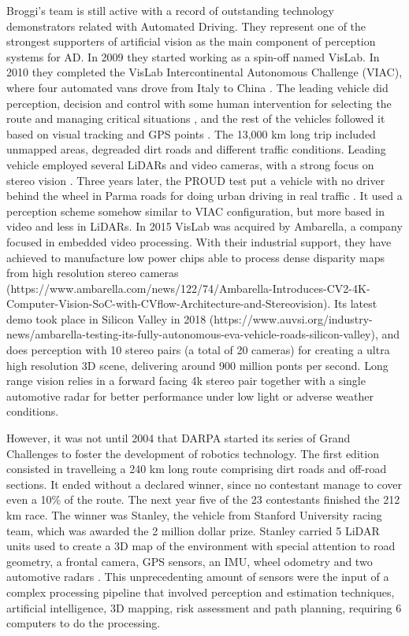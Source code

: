 Broggi's team is still active with a record of outstanding technology 
demonstrators related with Automated Driving. They represent one of the
strongest supporters of artificial vision as the main component of perception
systems for AD. 
In 2009 they started working as a spin-off named VisLab. In 2010 they 
completed the VisLab Intercontinental Autonomous Challenge (VIAC), where
four automated vans drove from Italy to China \cite{Bertozzi2011}.
The leading vehicle did perception, decision and control with some human 
intervention for selecting the route and managing critical situations
\cite{Broggi2012a}, and the rest of the vehicles followed it based on visual
tracking and GPS points \cite{Broggi2012a}. 
The 13,000 km long trip included unmapped areas, degreaded dirt roads and
different traffic conditions. Leading vehicle employed several LiDARs and
video cameras, with a strong focus on stereo vision \cite{Broggi2011}.
Three years later, the PROUD test put a vehicle with no driver behind the
wheel in Parma roads for doing urban driving in real traffic \cite{Broggi2013}. 
It used a perception scheme somehow similar to VIAC configuration, but more 
based in video and less in LiDARs.
In 2015 VisLab was acquired by Ambarella, a company focused in embedded video
processing. With their industrial support, they have achieved to manufacture
low power chips able to process dense disparity maps from high resolution 
stereo cameras 
(https://www.ambarella.com/news/122/74/Ambarella-Introduces-CV2-4K-Computer-Vision-SoC-with-CVflow-Architecture-and-Stereovision).
Its latest demo took place in Silicon Valley in 2018 
(https://www.auvsi.org/industry-news/ambarella-testing-its-fully-autonomous-eva-vehicle-roads-silicon-valley),
and does perception with 10 stereo pairs (a total of 20 cameras) for creating a
ultra high resolution 3D scene, delivering around 900 million ponts per second.
Long range vision relies in a forward facing 4k stereo pair together with a 
single automotive radar for better performance under low light or adverse
weather conditions.

However, it was not until 2004 that DARPA started its series of Grand Challenges
to foster the development of robotics technology. 
The first edition consisted in travelleing a 240 km long route comprising dirt 
roads and off-road sections. It ended without a declared winner, since no 
contestant manage to cover even a 10\% of the route.
The next year five of the 23 contestants finished the 212 km race. 
The winner was Stanley, the vehicle from Stanford University racing team, which 
was awarded the 2 million dollar prize.
Stanley carried 5 LiDAR units used to create a 3D map of the environment with 
special attention to road geometry, a frontal camera, GPS sensors, an IMU, 
wheel odometry and two automotive radars \cite{Thrun2006}. This unprecedenting
amount of sensors were the input of a complex processing pipeline that involved 
perception and estimation techniques, artificial intelligence, 3D mapping, risk 
assessment and path planning, requiring 6 computers to do the processing.

